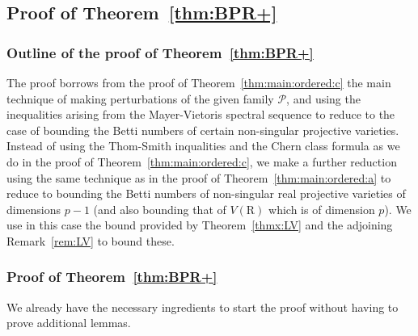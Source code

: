 \documentclass[10pt]{amsart}
\theoremstyle{definition}
\theoremstyle{remark}
\numberwithin{equation}{section}
\newcommand {\R} {\mathrm{R}}
\begin{document}
\subsection{Proof of Theorem~\ref{thm:BPR+}}

\subsubsection{Outline of the proof of Theorem~\ref{thm:BPR+}}
The proof borrows from the proof of Theorem~\ref{thm:main:ordered:c}
the main technique of making perturbations of the given family $\mathcal{P}$, and using the inequalities arising from the Mayer-Vietoris spectral sequence to reduce to the case of bounding the Betti numbers of certain non-singular projective varieties. 
Instead of using the Thom-Smith inqualities and the Chern class formula
as we do in the proof of Theorem~\ref{thm:main:ordered:c}, we make a further reduction using the same technique as in the proof of Theorem~\ref{thm:main:ordered:a} to reduce to bounding the Betti numbers of non-singular real projective varieties of dimensions $p-1$ (and also 
bounding that of $V(\R)$ which is of dimension $p$). We use in this case
the bound provided by Theorem~\ref{thmx:LV} and the adjoining Remark~\ref{rem:LV} to bound these.


\subsubsection{Proof of Theorem~\ref{thm:BPR+}}
We already have the necessary ingredients to start the proof without having to prove additional lemmas.
\end{document}
